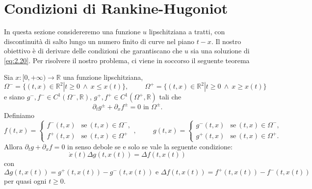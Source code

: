 \section{Condizioni di Rankine-Hugoniot}
In questa sezione considereremo una funzione $u$ lipschitziana a tratti, con discontinuità di salto lungo un numero finito di curve nel piano $t-x$. Il nostro obiettivo è di derivare delle condizioni che garantiscano che $u$ sia una soluzione di \eqref{eq:2.20}. Per risolvere il nostro problema, ci viene in soccorso il seguente teorema
\begin{teorema}
    Sia $x\colon [0,+\infty)\rightarrow\mathbb{R}$ una funzione lipschitziana, 
    \begin{equation*}
        \Omega^{-}=\{(t,x)\in\mathbb{R}^{2}|t\geq 0 \ \wedge \ x\leq x(t)\}, \hspace{1cm} \Omega^{+}=\{(t,x)\in\mathbb{R}^{2}|t\geq 0 \ \wedge \ x\geq x(t)\}
    \end{equation*}
    e siano $g^{-}, f^{-}\in C^{1}(\Omega^{-},\mathbb{R})$, $g^{+}, f^{+}\in C^{1}(\Omega^{+},\mathbb{R})$ tali che
    \begin{equation*}
        \partial_{t}g^{\pm} + \partial_{x}f^{\pm}=0 \text{ in } \Omega^{\pm}.
    \end{equation*}
    Definiamo
    \begin{equation*}
        f(t,x) =
        \begin{cases}
            f^{-}(t,x) & \text{se} \ (t,x)\in\Omega^{-}, \\
            f^{+}(t,x) & \text{se} \ (t,x)\in\Omega^{+}
        \end{cases}
        ,\hspace{1cm} g(t,x) =
        \begin{cases}
            g^{-}(t,x) & \text{se} \ (t,x)\in\Omega^{-}, \\
            g^{+}(t,x) & \text{se} \ (t,x)\in\Omega^{+}.
        \end{cases}
    \end{equation*}
    Allora $\partial_{t}g+\partial_{x}f=0$ in senso debole se e solo se vale la seguente condizione:
    \begin{equation}\label{eq:2.36}
        \dot{x}(t)\Delta g(t,x(t)) = \Delta f(t,x(t))
    \end{equation}
     con 
     \begin{equation*}
         \Delta g(t,x(t))=g^{+}(t,x(t))-g^{-}(t,x(t)) \text{ e } \Delta f(t,x(t))=f^{+}(t,x(t))-f^{-}(t,x(t))
     \end{equation*}
     per quasi ogni $t\geq 0$.
\end{teorema}
